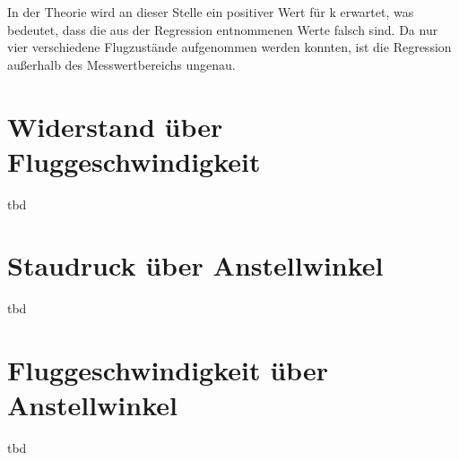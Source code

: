
 In der Theorie wird an dieser Stelle ein positiver Wert für k erwartet, was bedeutet, dass die aus der Regression entnommenen Werte falsch sind. Da nur vier verschiedene Flugzustände aufgenommen werden konnten, ist die Regression außerhalb des Messwertbereichs ungenau. 

\section{Widerstand über Fluggeschwindigkeit}
tbd

\section{Staudruck über Anstellwinkel}
tbd

\section{Fluggeschwindigkeit über Anstellwinkel}
tbd
